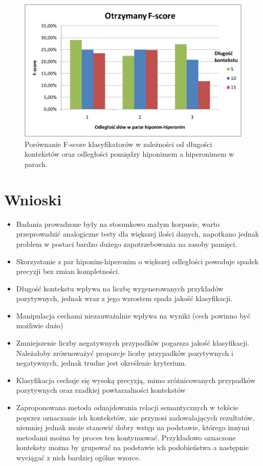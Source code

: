 \documentclass[a4paper,10pt]{report}
\begin{document}
\begin{figure}[h]
\centering
 \includegraphics[width=13cm]{img/image001.png}
 \caption{Porównanie F-score klasyfikatorów w zależności od długości kontekstów oraz odległości pomiędzy hiponimem a hiperonimem w parach.}
\label{fig:wykres}
\end{figure} 

\section{Wnioski}


\begin{itemize}
\item Badania prowadzone były na stosunkowo małym korpusie, warto przeprowadzić analogiczne testy dla większej ilości danych,
napotkano jednak problem w postaci bardzo dużego zapotrzebowania na zasoby pamięci.  

\item Skorzystanie z par hiponim-hiperonim o większej odległości powoduje spadek precyzji bez zmian kompletności.

\item Długość kontekstu wpływa na liczbę wygenerowanych przykładów pozytywnych, jednak wraz z jego wzrostem spada jakość klasyfikacji.

\item Manipulacja cechami niezauważalnie wpływa na wyniki (cech powinno być możliwie dużo)

\item Zmniejszenie liczby negatywnych przypadków pogarsza jakość klasyfikacji. Należałoby zrównoważyć proporcje liczby przypadków pozytywnych i negatywnych, jednak trudne jest określenie kryterium.

\item Klasyfikacja cechuje się wysoką precyzją, mimo zróżnicowanych przypadków pozytywnych oraz rzadkiej powtarzalności kontekstów

\item Zaproponowana metoda odnajdowania relacji semantycznych w tekście poprzez oznaczanie ich kontekstów, nie przynosi zadowalających rezultatów, niemniej jednak może stanowić dobry wstęp na podstawie, którego innymi metodami można by proces ten kontynuować. Przykładowo oznaczone konteksty można by grupować na podstawie ich podobieństwa a następnie wyciągać z nich bardziej ogólne wzorce.

\end{itemize}
\end{document}
